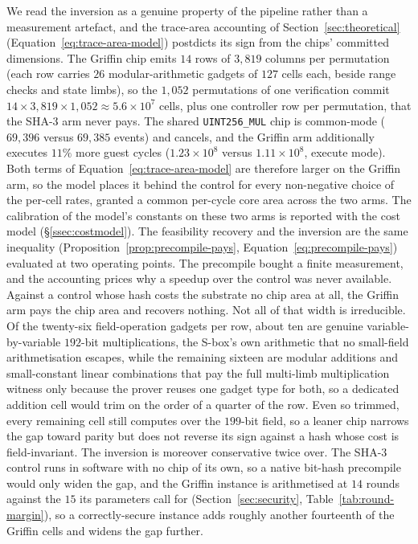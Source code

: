 We read the inversion as a genuine property of the pipeline rather than a measurement artefact, and the trace-area accounting of Section~\ref{sec:theoretical} (Equation~\eqref{eq:trace-area-model}) postdicts its sign from the chips' committed dimensions. The Griffin chip emits $14$ rows of $3{,}819$ columns per permutation (each row carries $26$ modular-arithmetic gadgets of $127$ cells each, beside range checks and state limbs), so the $1{,}052$ permutations of one verification commit $14\times 3{,}819\times 1{,}052\approx 5.6\times10^{7}$ cells, plus one controller row per permutation, that the SHA-3 arm never pays. The shared \texttt{UINT256\_MUL} chip is common-mode ($69{,}396$ versus $69{,}385$ events) and cancels, and the Griffin arm additionally executes $11\%$ more guest cycles ($1.23\times10^{8}$ versus $1.11\times10^{8}$, execute mode). Both terms of Equation~\eqref{eq:trace-area-model} are therefore larger on the Griffin arm, so the model places it behind the control for every non-negative choice of the per-cell rates, granted a common per-cycle core area across the two arms. The calibration of the model's constants on these two arms is reported with the cost model (\S\ref{ssec:costmodel}). The feasibility recovery and the inversion are the same inequality (Proposition~\ref{prop:precompile-pays}, Equation~\eqref{eq:precompile-pays}) evaluated at two operating points. The precompile bought a finite measurement, and the accounting prices why a speedup over the control was never available. Against a control whose hash costs the substrate no chip area at all, the Griffin arm pays the chip area and recovers nothing. Not all of that width is irreducible. Of the twenty-six field-operation gadgets per row, about ten are genuine variable-by-variable $192$-bit multiplications, the S-box's own arithmetic that no small-field arithmetisation escapes, while the remaining sixteen are modular additions and small-constant linear combinations that pay the full multi-limb multiplication witness only because the prover reuses one gadget type for both, so a dedicated addition cell would trim on the order of a quarter of the row. Even so trimmed, every remaining cell still computes over the $199$-bit field, so a leaner chip narrows the gap toward parity but does not reverse its sign against a hash whose cost is field-invariant. The inversion is moreover conservative twice over. The SHA-3 control runs in software with no chip of its own, so a native bit-hash precompile would only widen the gap, and the Griffin instance is arithmetised at $14$ rounds against the $15$ its parameters call for (Section~\ref{sec:security}, Table~\ref{tab:round-margin}), so a correctly-secure instance adds roughly another fourteenth of the Griffin cells and widens the gap further.

